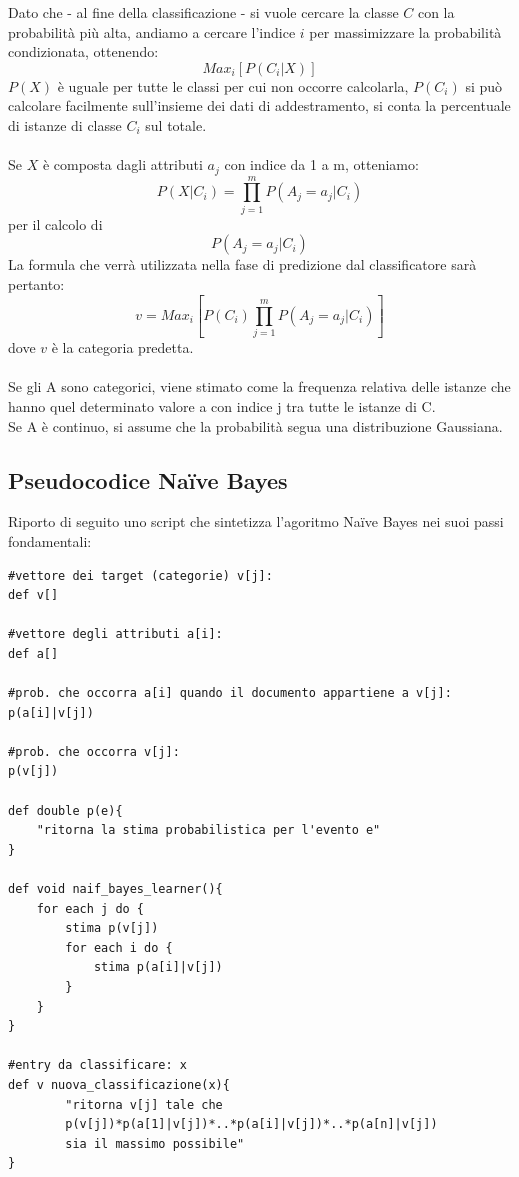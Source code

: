 \documentclass{article}
\theoremstyle{plain}
\theoremstyle{definition}
\begin{document}
Dato che - al fine della classificazione - si vuole cercare la classe $C$ con la probabilità più alta, andiamo a cercare l'indice $i$ per massimizzare la probabilità condizionata, ottenendo: 
$$Max_i [P(C_i|X)]$$
$P(X)$ è uguale per tutte le classi per cui non occorre calcolarla, $P(C_i)$ si può calcolare facilmente sull'insieme dei dati di addestramento, si conta la percentuale di istanze di classe $C_i$ sul totale.
\\
\\
Se $X$ è composta dagli attributi $a_j$ con indice da 1 a m, otteniamo:
$$P(X|C_i)=\prod_{j=1}^m P(A_j=a_j|C_i)$$
per il calcolo di 
$$P(A_j=a_j|C_i)$$
La formula che verrà utilizzata nella fase di predizione dal classificatore sarà pertanto:
$$v=Max_i [P(C_i)\prod_{j=1}^m P(A_j=a_j|C_i)]$$
dove $v$ è la categoria predetta.
\\
\\
Se gli A sono categorici, viene stimato come la frequenza relativa delle istanze che hanno quel determinato valore a con indice j tra tutte le istanze di C.
\\
Se A è continuo, si assume che la probabilità segua una distribuzione Gaussiana.

\newpage
\subsection{Pseudocodice Naïve Bayes}
Riporto di seguito uno script che sintetizza l'agoritmo Naïve Bayes nei suoi passi fondamentali:

\begin{lstlisting}
#vettore dei target (categorie) v[j]:
def v[]

#vettore degli attributi a[i]:
def a[]

#prob. che occorra a[i] quando il documento appartiene a v[j]:
p(a[i]|v[j]) 

#prob. che occorra v[j]:
p(v[j])

def double p(e){
	"ritorna la stima probabilistica per l'evento e"
}

def void naif_bayes_learner(){
	for each j do {
		stima p(v[j])
		for each i do {
			stima p(a[i]|v[j])
		}
	}
}

#entry da classificare: x
def v nuova_classificazione(x){
		"ritorna v[j] tale che
		p(v[j])*p(a[1]|v[j])*..*p(a[i]|v[j])*..*p(a[n]|v[j])
		sia il massimo possibile"
}
\end{lstlisting}
\end{document}
